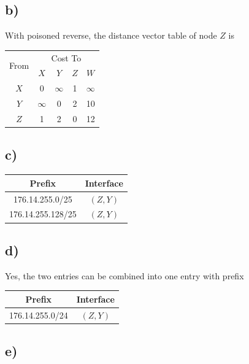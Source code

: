 \documentclass[a4paper,12pt]{article}
\begin{document}
\subsection*{b)}

With poisoned reverse, the distance vector table of node $Z$ is
\begin{table}[H]
  \centering
  \begin{tabular}{ccccc}
    \toprule
    \multirow{2}{*}{From} & \multicolumn{4}{c}{Cost To} \\
    \cmidrule{2-5}
    & $X$ & $Y$ & $Z$ & $W$ \\
    \midrule
    $X$ & 0 & $\infty$ & 1 & $\infty$ \\
    $Y$ & $\infty$ & 0 & 2 & 10 \\
    $Z$ & 1 & 2 & 0 & 12 \\
    \bottomrule
  \end{tabular}
\end{table}

\subsection*{c)}

\begin{table}[H]
  \centering
  \begin{tabular}{cc}
    \toprule
    Prefix & Interface \\
    \midrule
    176.14.255.0/25 & $(Z, Y)$ \\
    176.14.255.128/25 & $(Z, Y)$ \\
    \bottomrule
  \end{tabular}
\end{table}

\subsection*{d)}

Yes, the two entries can be combined into one entry with prefix
\begin{table}[H]
  \centering
  \begin{tabular}{cc}
    \toprule
    Prefix & Interface \\
    \midrule
    176.14.255.0/24 & $(Z, Y)$ \\
    \bottomrule
  \end{tabular}
\end{table}

\subsection*{e)}
\end{document}
